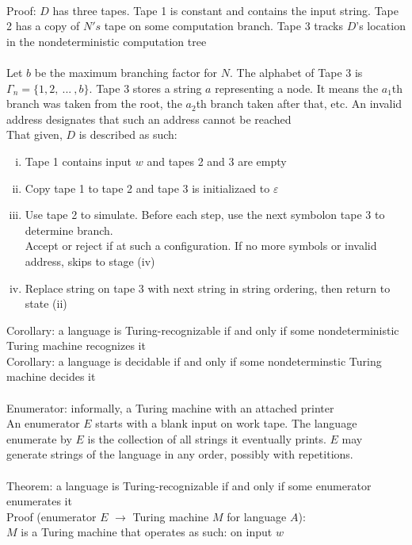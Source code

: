 \documentclass{article}
\newcommand*{\<}{\langle}
\renewcommand*{\>}{\rangle}
\begin{document}
			\\
			Proof: $D$ has three tapes. Tape 1 is constant and contains the input string. Tape 2 has a copy of $N's$ tape on some computation branch. Tape 3 tracks $D$'s location in the nondeterministic computation tree \\
			\\
			Let $b$ be the maximum branching factor for $N$. The alphabet of Tape 3 is $\Gamma_n = \{1, 2,\:...\:, b\}$. Tape 3 stores a string $a$ representing a node. It means the $a_1$th branch was taken from the root, the $a_2$th branch taken after that, etc. An invalid address designates that such an address cannot be reached \\
			That given, $D$ is described as such:
			\begin{enumerate}[(i)]
				\item Tape 1 contains input $w$ and tapes 2 and 3 are empty
				\item Copy tape 1 to tape 2 and tape 3 is initializaed to $\varepsilon$
				\item Use tape 2 to simulate. Before each step, use the next symbolon tape 3 to determine branch. \\
				Accept or reject if at such a configuration. If no more symbols or invalid address, skips to stage (iv)
				\item Replace string on tape 3 with next string in string ordering, then return to state (ii)
				\end{enumerate}
			Corollary: a language is Turing-recognizable if and only if some nondeterministic Turing machine recognizes it \\
			Corollary: a language is decidable if and only if some nondeterminstic Turing machine decides it \\
			\\
			Enumerator: informally, a Turing machine with an attached printer \\
			An enumerator $E$ starts with a blank input on work tape. The language enumerate by $E$ is the collection of all strings it eventually prints. $E$ may generate strings of the language in any order, possibly with repetitions. \\
			\\
			Theorem: a language is Turing-recognizable if and only if some enumerator enumerates it \\
			Proof (enumerator $E$ $\to$ Turing machine $M$ for language $A$): \\
			$M$ is a Turing machine that operates as such: on input $w$ 
\end{document}
